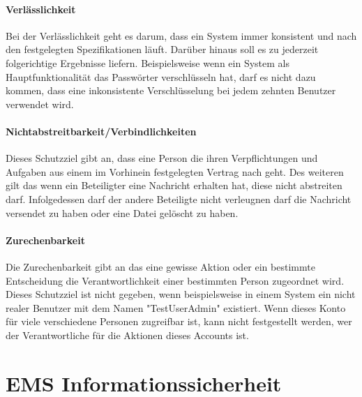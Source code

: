 \paragraph{Verlässlichkeit}
Bei der Verlässlichkeit geht es darum, dass ein System immer konsistent und nach den festgelegten Spezifikationen läuft. Darüber hinaus soll es zu jederzeit folgerichtige Ergebnisse liefern. Beispielsweise wenn ein System als Hauptfunktionalität das Passwörter verschlüsseln hat, darf es nicht dazu kommen, dass eine inkonsistente Verschlüsselung bei jedem zehnten Benutzer verwendet wird.

\paragraph{Nichtabstreitbarkeit/Verbindlichkeiten}
Dieses Schutzziel gibt an, dass eine Person die ihren Verpflichtungen und Aufgaben aus einem im Vorhinein festgelegten Vertrag nach geht. Des weiteren gilt das wenn ein Beteiligter eine Nachricht erhalten hat, diese nicht abstreiten darf. Infolgedessen darf der andere Beteiligte nicht verleugnen darf die Nachricht versendet zu haben oder eine Datei gelöscht zu haben.


\paragraph{Zurechenbarkeit}
Die Zurechenbarkeit gibt an das eine gewisse Aktion oder ein bestimmte Entscheidung die Verantwortlichkeit einer bestimmten Person zugeordnet wird. Dieses Schutzziel ist nicht gegeben, wenn beispielsweise in einem System ein nicht realer Benutzer mit dem Namen "TestUserAdmin" existiert. Wenn dieses Konto für viele verschiedene Personen zugreifbar ist, kann nicht festgestellt werden, wer der Verantwortliche für die Aktionen dieses Accounts ist.


\section{EMS Informationssicherheit}


\newpage